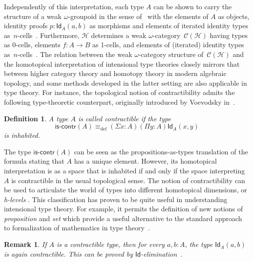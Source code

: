\documentclass[reqno,10pt,a4paper,oneside]{amsart}
\numberwithin{equation}{section}
\theoremstyle{mythm}
\theoremstyle{mydef}
\newtheorem{definition}[theorem]{Definition}
\theoremstyle{myrmk}
\newtheorem{remark}[theorem]{Remark}
\newcommand{\deq}{\equiv}
\newcommand{\defeq}{\deq_{\mathrm{def}}}
\newcommand{\Hint}{\mathcal{H}}
\newcommand{\iscontr}{\mathsf{is}\text{-}\mathsf{contr}}
\newcommand{\Id}{\mathsf{Id}}
\newcommand{\id}[1]{\Id_{#1}}
\begin{document}
Independently of this interpretation, each type $A$ can be shown to carry the structure of a weak 
$\omega$-groupoid in the sense of~\cite{BataninM:mongcn,LeinsterT:higohc} with the elements of $A$ as objects, identity proofs $p : \id{A}(a,b)$ as morphisms and 
 elements of iterated identity types 
 as~$n$-cells~\cite{vandenBergB:typwg,LumsdaineP:weaci}. Furthermore, $\Hint$ 
 determines a weak $\omega$-category~$\mathcal{C}(\Hint)$ having types as 0-cells, elements $f : A \rightarrow B$ as 1-cells, and elements of (iterated) identity types 
as~$n$-cells~\cite{Lumsdaine:higcft}.   The relation between the weak $\omega$-category structure of~$\mathcal{C}(\Hint)$ and the homotopical interpretation of intensional type theories closely mirrors that between higher category theory and homotopy theory in modern algebraic topology, and some methods developed in the latter setting are also applicable in type theory.  For instance,
 the topological notion of contractibility admits the following type-theoretic counterpart, originally
 introduced by Voevodsky in~\cite{VoevodskyV:unifc}.


\begin{definition}  A type $A$ is called \emph{contractible} if the  type 
 \begin{equation}
 \label{eq:contractible}
\iscontr(A) \defeq (\Sigma x:A)(\Pi y:A)\id{A}(x,y)
\end{equation}
is inhabited.
\end{definition} 

The type $\iscontr(A)$ can be seen as the propositions-as-types translation
of the formula stating that $A$ has a unique element. However, its homotopical interpretation 
is as a space that is inhabited if and only if the space interpreting $A$ is contractible in the usual
topological sense. The notion of contractibility can be used to articulate the world of types into different homotopical dimensions, or \emph{h-levels} \cite{VoevodskyV:unifc}. This classification has proven to be quite useful in understanding intensional type theory.  
For example, it permits the definition of new notions of \emph{proposition} and \emph{set} which provide a useful alternative to the standard approach to formalization of mathematics in type theory~\cite{VoevodskyV:unifc}.

\begin{remark} \label{thm:idcontrcontr}
If $A$ is a contractible type, then for every $a, b : A$, the type $\id{A}(a,b)$ is again contractible. This can be proved  by $\Id$-elimination~\cite{AwodeyS:indtht}. 
\end{remark}
\end{document}
